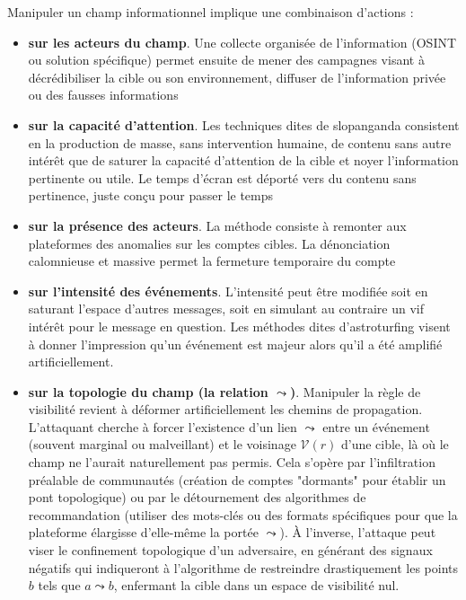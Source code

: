 \documentclass[11pt]{article}
\begin{document}
			Manipuler un champ informationnel implique une combinaison d'actions : 
			\begin{itemize}
				\item \textbf{sur les acteurs du champ}. Une collecte organisée de l'information (OSINT ou solution spécifique) permet ensuite de mener des campagnes visant à décrédibiliser la cible ou son environnement, diffuser de l'information privée ou des fausses informations
				\item \textbf{sur la capacité d'attention}. Les techniques dites de slopanganda consistent en la production de masse, sans intervention humaine, de contenu sans autre intérêt que de saturer la capacité d'attention de la cible et noyer l'information pertinente ou utile. Le temps d'écran est déporté vers du contenu sans pertinence, juste conçu pour passer le temps
				\item \textbf{sur la présence des acteurs}. La méthode consiste à remonter aux plateformes des anomalies sur les comptes cibles. La dénonciation calomnieuse et massive permet la fermeture temporaire du compte
				\item \textbf{sur l'intensité des événements}. L'intensité peut être modifiée soit en saturant l'espace d'autres messages, soit en simulant au contraire un vif intérêt pour le message en question. Les méthodes dites d'astroturfing visent à donner l'impression qu'un événement est majeur alors qu'il a été amplifié artificiellement. 
				\item \textbf{sur la topologie du champ (la relation $\leadsto$)}. Manipuler la règle de visibilité revient à déformer artificiellement les chemins de propagation. L'attaquant cherche à forcer l'existence d'un lien $\leadsto$ entre un événement (souvent marginal ou malveillant) et le voisinage $\mathcal{V}(r)$ d'une cible, là où le champ ne l'aurait naturellement pas permis. Cela s'opère par l'infiltration préalable de communautés (création de comptes "dormants" pour établir un pont topologique) ou par le détournement des algorithmes de recommandation (utiliser des mots-clés ou des formats spécifiques pour que la plateforme élargisse d'elle-même la portée $\leadsto$). À l'inverse, l'attaque peut viser le confinement topologique d'un adversaire, en générant des signaux négatifs qui indiqueront à l'algorithme de restreindre drastiquement les points $b$ tels que $a \leadsto b$, enfermant la cible dans un espace de visibilité nul.
			\end{itemize}
			
\end{document}
